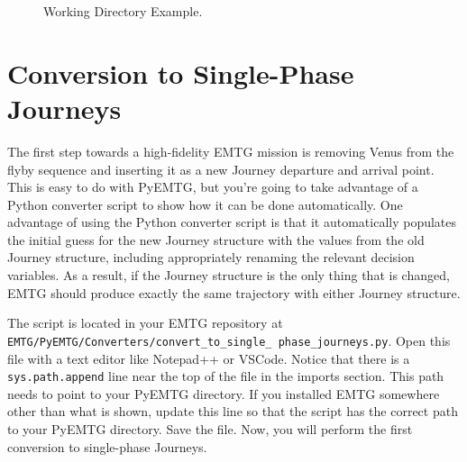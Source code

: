 \documentclass[11pt]{article}
\begin{document}
\begin{figure}[H]
	\centering
	\caption{\label{fig:working_dir_ex}Working Directory Example.}
\end{figure}

\section{Conversion to Single-Phase Journeys}
\label{sec:conversion_to_single_phase_journeys}

The first step towards a high-fidelity \ac{EMTG} mission is removing Venus from the flyby sequence and inserting it as a new Journey departure and arrival point. This is easy to do with PyEMTG, but you’re going to take advantage of a Python converter script to show how it can be done automatically. One advantage of using the Python converter script is that it automatically populates the initial guess for the new Journey structure with the values from the old Journey structure, including appropriately renaming the relevant decision variables. As a result, if the Journey structure is the only thing that is changed, \ac{EMTG} should produce exactly the same trajectory with either Journey structure.

\noindent The script is located in your \ac{EMTG} repository at \texttt{EMTG/PyEMTG/Converters/convert\_to\_single\_ phase\_journeys.py}. Open this file with a text editor like Notepad++ or VSCode. Notice that there is a \texttt{sys.path.append} line near the top of the file in the imports section. This path needs to point to your PyEMTG directory. If you installed EMTG somewhere other than what is shown, update this line so that the script has the correct path to your PyEMTG directory. Save the file. Now, you will perform the first conversion to single-phase Journeys.
\end{document}
